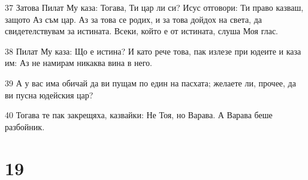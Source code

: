 \par 37 Затова Пилат Му каза: Тогава, Ти цар ли си? Исус отговори: Ти право казваш, защото Аз съм цар. Аз за това се родих, и за това дойдох на света, да свидетелствувам за истината. Всеки, който е от истината, слуша Моя глас.
\par 38 Пилат Му каза: Що е истина? И като рече това, пак излезе при юдеите и каза им: Аз не намирам никаква вина в него.
\par 39 А у вас има обичай да ви пущам по един на пасхата; желаете ли, прочее, да ви пусна юдейския цар?
\par 40 Тогава те пак закрещяха, казвайки: Не Тоя, но Варава. А Варава беше разбойник.

\chapter{19}

